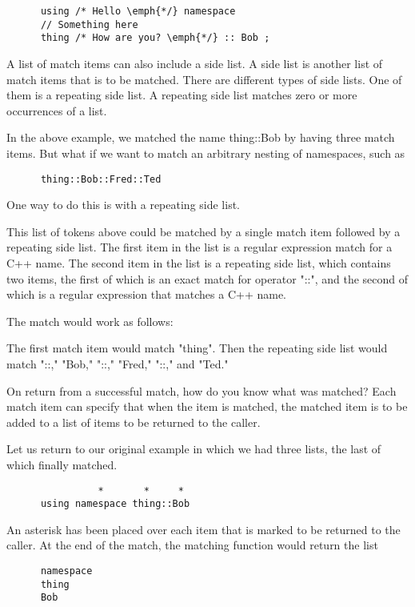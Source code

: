 \small{\begin{verbatim}
      using /* Hello \emph{*/} namespace
      // Something here
      thing /* How are you? \emph{*/} :: Bob ;
\end{verbatim}}

A list of match items can also include a side list.  A side list is another
list of match items that is to be matched.  There are different types of side
lists.  One of them is a repeating side list.  A repeating side list matches
zero or more occurrences of a list.

In the above example, we matched the name thing::Bob by having three match
items.  But what if we want to match an arbitrary nesting of namespaces, such
as

\small{\begin{verbatim}
      thing::Bob::Fred::Ted
\end{verbatim}}

One way to do this is with a repeating side list.

This list of tokens above could be matched by a single match item followed by
a repeating side list.  The first item in the list is a regular expression
match for a C++ name.  The second item in the list is a repeating side list,
which contains two items, the first of which is an exact match for operator
"::", and the second of which is a regular expression that matches a C++
name.

The match would work as follows:

The first match item would match "thing".  Then the repeating side list would
match "::," "Bob," "::," "Fred," "::," and "Ted."

On return from a successful match, how do you know what was matched?  Each
match item can specify that when the item is matched, the matched item is to
be added to a list of items to be returned to the caller.

Let us return to our original example in which we had three lists, the last
of which finally matched.

\small{\begin{verbatim}
                *       *     *
      using namespace thing::Bob
\end{verbatim}}

An asterisk has been placed over each item that is marked to be returned to
the caller.  At the end of the match, the matching function would return the
list

\small{\begin{verbatim}
      namespace
      thing
      Bob
\end{verbatim}}

